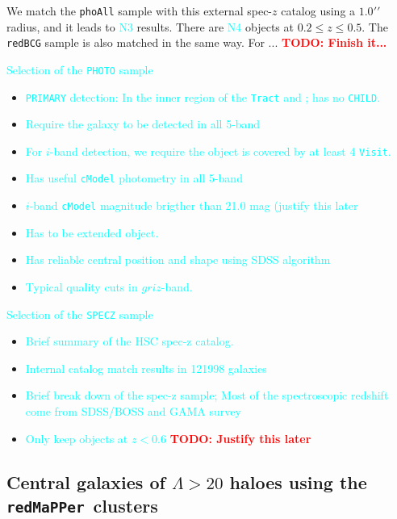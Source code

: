 \documentclass[preprint]{aastex}
\def\arcsec{{\prime\prime}}
\def\redm{\texttt{redMaPPer\ }}
\newcommand{\todo}[1]{\textcolor{red}{\textbf{TODO: #1}}}
\newcommand{\plan}[1]{\textcolor{cyan}{#1}}
\begin{document}
\begin{CJK*}{UTF8}{gbsn}
    We match the \texttt{phoAll} sample with this external spec-$z$ catalog 
    using a $1.0 \arcsec$ radius, and it leads to \plan{N3} results. 
    There are \plan{N4} objects at $0.2 \leq z \leq 0.5$.   
    The \texttt{redBCG} sample is also matched in the same way. 
    For ...
    \todo{Finish it...}
    
    
    
    


   
    \plan{Selection of the \texttt{PHOTO} sample}
    \begin{itemize}
        \item \plan{\texttt{PRIMARY} detection: In the inner region of the \texttt{Tract}
            and \textt{Patch}; has no \texttt{CHILD}.}
        \item \plan{Require the galaxy to be detected in all 5-band}
        \item \plan{For $i$-band detection, we require the object is covered by at least 
            4 \texttt{Visit}.}
        \item \plan{Has useful \texttt{cModel} photometry in all 5-band}
        \item \plan{$i$-band \texttt{cModel} magnitude brigther than 21.0 mag (justify this 
            later}
        \item \plan{Has to be extended object.}
        \item \plan{Has reliable central position and shape using SDSS algorithm}
        \item \plan{Typical quality cuts in $griz$-band.}
    \end{itemize}
    
    \plan{Selection of the \texttt{SPECZ} sample}
    \begin{itemize}
        \item \plan{Brief summary of the HSC spec-z catalog.}
        \item \plan{Internal catalog match results in 121998 galaxies}
        \item \plan{Brief break down of the spec-z sample; Most of the spectroscopic 
            redshift come from SDSS/BOSS and GAMA survey}
        \item \plan{Only keep objects at $z < 0.6$} \todo{Justify this later}
    \end{itemize}

\subsection{Central galaxies of $\Lambda > 20$ haloes using the \redm clusters}


\end{CJK*}
\end{document}

